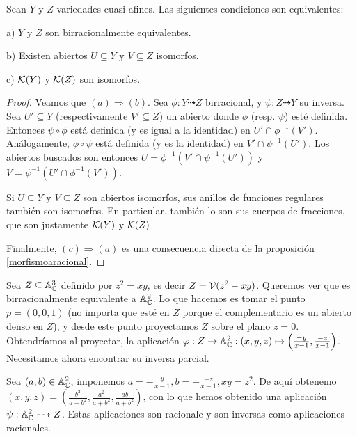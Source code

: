 \documentclass[ACGA.tex]{subfiles}
\begin{document}
\begin{prop}\label{birracional}
 Sean $Y$ y $Z$ variedades cuasi-afines. Las siguientes condiciones son equivalentes:

a) $Y$ y $Z$ son birracionalmente equivalentes.

b) Existen abiertos $U\subseteq Y$ y $V\subseteq Z$ isomorfos.

c) ${\mathcal K}(Y)$ y ${\mathcal K}(Z)$ son isomorfos. 

\end{prop}

\begin{proof}
 Veamos que $(a)\Rightarrow(b)$. Sea $\phi:Y\dashrightarrow Z$ birracional, y $\psi:Z\dashrightarrow Y$ su inversa. Sea $U'\subseteq Y$ (respectivamente $V'\subseteq Z$) un abierto donde $\phi$ (resp. $\psi$) esté definida. Entonces $\psi\circ\phi$ está definida (y es igual a la identidad) en $U'\cap \phi^{-1}(V')$. Análogamente, $\phi\circ\psi$ está definida (y es la identidad) en $V'\cap\psi^{-1}(U')$. Los abiertos buscados son entonces $U=\phi^{-1}(V'\cap\psi^{-1}(U'))$ y $V=\psi^{-1}(U'\cap \phi^{-1}(V'))$.

Si $U\subseteq Y$ y $V\subseteq Z$ son abiertos isomorfos, sus anillos de funciones regulares también son isomorfos. En particular, también lo son sus cuerpos de fracciones, que son justamente ${\mathcal K}(Y)$ y ${\mathcal K}(Z)$. 

Finalmente, $(c)\Rightarrow(a)$ es una consecuencia directa de la proposición \ref{morfismoaracional}.
\end{proof}

\begin{ej}
Sea $Z\subseteq\mathbb{A}^3_{\mathbb{C}}$ definido por $z^2=xy$, es decir $Z=\mathcal{V}(z^2-xy)$. Queremos ver que es birracionalmente equivalente a $\mathbb{A}^2_{\mathbb{C}}$. Lo que hacemos es tomar el punto $p=(0,0,1)$ (no importa que esté en $Z$ porque el complementario es un abierto denso en $Z$), y desde este punto proyectamos $Z$ sobre el plano $z=0$. Obtendríamos al proyectar, la aplicación $\varphi:Z\to\mathbb{A}^2_{\mathbb{C}}:(x,y,z)\mapsto\left(\frac{-y}{x-1},\frac{-z}{x-1}\right)$. Necesitamos ahora encontrar su inversa parcial.

 Sea $(a,b)\in\mathbb{A}^2_{\mathbb{C}}$, imponemos $a=-\frac{y}{x-1}, b=-\frac{-z}{x-1}, xy=z^2$. De aquí obtenemo $(x,y,z)=\left(\frac{b^2}{a+b^2},\frac{a^2}{a+b^2},\frac{ab}{a+b^2}\right)$, con lo que hemos obtenido una aplicación $\psi:\mathbb{A}^2_{\mathbb{C}}\dashrightarrow Z$. Estas aplicaciones son racionale y son inversas como aplicaciones racionales.
\end{ej}
\end{document}
